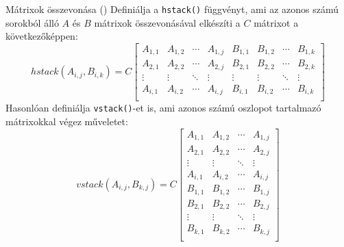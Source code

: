 \begin{frame}
  \footnotesize
  \begin{exampleblock}{Mátrixok összevonása ()}
    Definiálja a \texttt{hstack()} függvényt, ami az azonos számú sorokból álló $A$ és $B$ mátrixok összevonásával elkészíti a $C$ mátrixot a következőképpen:
    \tiny
    \[ hstack(A_{i,j}, B_{i,k}) = C\begin{bmatrix} 
      A_{1, 1} & A_{1, 2} & \cdots & A_{1, j} & B_{1, 1} & B_{1, 2} & \cdots & B_{1, k} \\
      A_{2, 1} & A_{2, 2} & \cdots & A_{2, j} & B_{2, 1} & B_{2, 2} & \cdots & B_{2, k} \\
      \vdots & \vdots & \ddots & \vdots & \vdots & \vdots & \ddots & \vdots \\
      A_{i, 1} & A_{i, 2} & \cdots & A_{i, j} & B_{i, 1} & B_{i, 2} & \cdots & B_{i, k} \\
    \end{bmatrix} \]
    \footnotesize
    Hasonlóan definiálja \texttt{vstack()}-et is, ami azonos számú oszlopot tartalmazó mátrixokkal végez műveletet:
    \tiny
    \[ vstack(A_{i,j}, B_{k,j}) = C\begin{bmatrix} 
      A_{1, 1} & A_{1, 2} & \cdots & A_{1, j} \\
      A_{2, 1} & A_{2, 2} & \cdots & A_{2, j} \\
      \vdots & \vdots & \ddots & \vdots \\
      A_{i, 1} & A_{i, 2} & \cdots & A_{i, j} \\
      B_{1, 1} & B_{1, 2} & \cdots & B_{1, j} \\
      B_{2, 1} & B_{2, 2} & \cdots & B_{2, j} \\
      \vdots & \vdots & \ddots & \vdots \\
      B_{k, 1} & B_{k, 2} & \cdots & B_{k, j} \\
    \end{bmatrix} \]
  \end{exampleblock}
\end{frame}